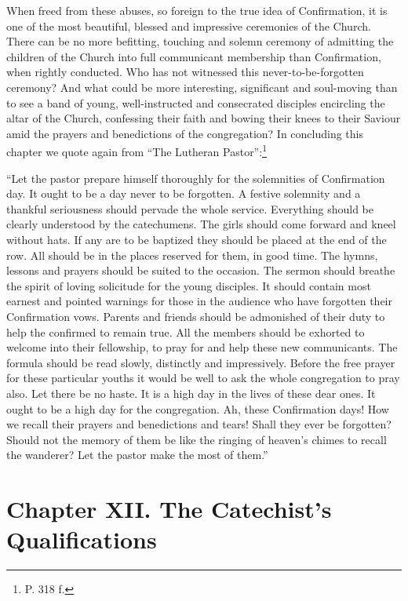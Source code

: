 When freed from these abuses, so foreign to the
true idea of Confirmation,  it is one of the most beautiful, blessed and impressive ceremonies of the Church. There can be no more befitting, touching and solemn ceremony of admitting the children of the Church into full communicant membership than Confirmation, when rightly conducted. Who has not witnessed this never-to-be-forgotten ceremony? And what could be more interesting, significant and soul-moving than to see a band of young, well-instructed and consecrated disciples encircling the altar of the Church, confessing their faith and bowing their knees to their Saviour amid the prayers and benedictions of the congregation? In concluding this chapter we quote again from “The Lutheran Pastor”:\footnote{P. 318 f.}

“Let the pastor prepare himself thoroughly for the solemnities of Confirmation day. It ought to be a day never to be forgotten. A festive solemnity and a thankful seriousness should pervade the whole service. Everything should be clearly understood by the catechumens. The girls should come forward and kneel without hats. If any are to be baptized they should be placed at the end of the row. All should be in the places reserved for them, in good time. The hymns, lessons and prayers should be suited to the occasion. The sermon should breathe the spirit of loving solicitude for the young
disciples. It should contain most earnest and pointed warnings for those in the audience who have forgotten their Confirmation vows. Parents and friends should be admonished of their duty to help the confirmed to remain true. All the members should be exhorted to welcome into their fellowship, to pray for and help these new communicants. The formula should be read slowly, distinctly and impressively. Before the free prayer for these particular youths it would be well to ask the whole congregation to pray also. Let there be no haste. It is a high day in the lives of these dear ones. It ought to be a high day for the congregation. Ah, these Confirmation days! How we recall their prayers and benedictions and tears! Shall they ever be forgotten? Should not the memory of them be like the ringing of heaven’s chimes to recall the wanderer? Let the pastor make the most of them.”

\chapter{Chapter XII. The Catechist’s Qualifications}

